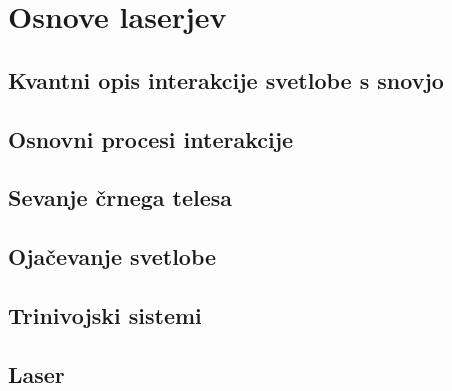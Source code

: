 
\chapter{Osnove laserjev}

\section{Kvantni opis interakcije svetlobe s snovjo}
\section{Osnovni procesi interakcije}
\section{Sevanje črnega telesa}
\section{Ojačevanje svetlobe}
\section{Trinivojski sistemi}
\section{Laser}

